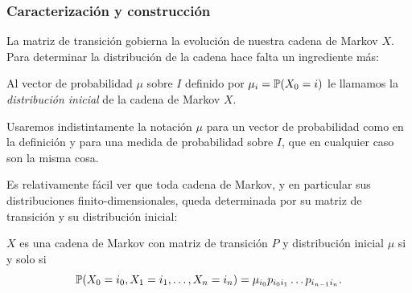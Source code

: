 \subsubsection{Caracterización y construcción}

La matriz de transición gobierna la evolución de nuestra cadena de Markov $X$.
Para determinar la distribución de la cadena hace falta un ingrediente más:

\begin{defn}
Al vector de probabilidad $\mu$ sobre $I$ definido por $\mu_i=\mathbb{P}(X_0=i)$ le llamamos la \emph{distribución inicial} de la cadena de Markov $X$.
\end{defn}

Usaremos indistintamente la notación $\mu$ para un vector de probabilidad como en la definición y para una medida de probabilidad sobre $I$, que en cualquier caso son la misma cosa.

Es relativamente fácil ver que toda cadena de Markov, y en particular sus distribuciones finito-dimensionales, queda determinada por su matriz de transición y su distribución inicial:

\begin{prop}\label{prop:caractMarkov}
$X$ es una cadena de Markov con matriz de transición $P$ y distribución inicial $\mu$ si y solo si
\[\mathbb{P}(X_0=i_0,X_1=i_1,\dotsc,X_n=i_n)=\mu_{i_0}p_{i_0i_1}\dotsc p_{i_{n-1}i_n}.\]
\end{prop}

